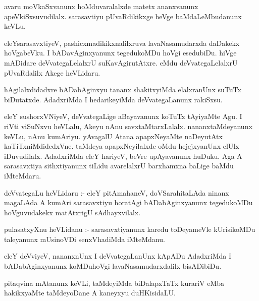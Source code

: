 \documentclass{article}
\begin{document}
\begin{mn}
avaru  moVkaSxvanunx  hoMduvaralalxde  matetx ananxvanunx  apeVkiSxsuvudilalx.  
sarasavtiyu  pUvaRdikikxge  heVge  baMdaLeMbudanunx  keVLu.
\end{mn}

\begin{mn}
eleYsarasavxtiyeV,  pashicxmadikikxnalilxruva  lavaNasamudarxda  daDakekx  hoVgabeVku.  
I  bADavAginxyanunx  tegedukoMDu  hoVgi  esedubiDu.  hiVge  mADidare  deVvategaLelalxrU  
suKavAgirutAtxre.  eMdu  deVvategaLelalxrU  pUvaRdalilx  Akege  heVLidaru. 
\end{mn}

\begin{mn}
hAgilalxdidadxre  bADabAginxyu  tananx  shakitxyiMda  elalxranUnx  suTuTx  
biDutatxde.  AdadxriMda  I  hedarikeyiMda  deVvategaLanunx  rakiSxsu.
\end{mn}

\begin{mn}
eleY  sushorxVNiyeV,  deVvategaLige  aBayavanunx  koTuTx  tAyiyaMte  Agu.  I riVti  
viSuNxvu  heVLalu,  Akeyu  nAnu  savxtaMtarxLalalx.  nananxtaMdeyanunx  keVLu,  nAnu  
kumAriyu.  yAvagalU  Atana  apapxNeyaMte  naDeyutAtx  kaTiTxniMdidedxVne.  taMdeya  
apapxNeyilalxde  oMdu  hejejxyanUnx  elUlx  iDuvudilalx.  AdadxriMda  eleY  hariyeV,  
beVre  upAyavanunx  huDuku.  Aga A  sarasavxtiya  sithxtiyanunx  tiLidu  avarelalxrU  
barxhamxna  baLige  baMdu  iMteMdaru.
\end{mn}

\begin{mn}
deVvategaLu  heVLidaru :- eleY  pitAmahaneV,  doVSarahitaLAda  ninanx  magaLAda  A  kumAri  
sarasavxtiyu  horatAgi  bADabAginxyanunx  tegedukoMDu  hoVguvudakekx  matAtxrigU  sAdhayxvilalx. 
\end{mn}

\begin{mn}
pulasatxyXnu  heVLidanu :- sarasavxtiyanunx  karedu  toDeyameVle  kUrisikoMDu  
taleyanunx  mUsinoVDi  senxVhadiMda  iMteMdanu.
\end{mn}

\begin{mn}
eleY  deVviyeV,  nananxnUnx  I  deVvategaLanUnx  kApADu  AdadxriMda  I  
bADabAginxyanunx  koMDuhoVgi  lavaNasamudarxdalilx  bisADibiDu.
\end{mn}

\begin{mn}
pitaqvina  mAtanunx  keVLi,  taMdeyiMda  biDalapxTaTx  kurariV  eMba  
hakikxyaMte  taMdeyoDane  A  kaneyxyu  duHKisidaLU. 
\end{mn}
\end{document}
